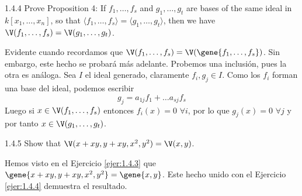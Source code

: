 \documentclass[twoside]{article}
\begin{document}
\newpage

\begin{ejercicio}{1.4.4}
Prove Proposition 4: If $f_1,\dots,f_s$ and $g_1,\dots,g_t$ are bases of the same ideal in $k[x_1,\dots,x_n]$, so that $\langle f_1,\dots,f_s\rangle = \langle g_1,\dots,g_t\rangle$, then we have $\V(f_1,\dots,f_s) = \V(g_1,\dots,g_t)$.
\end{ejercicio}
\begin{solucion}
Evidente cuando recordamos que $\V(f_1,\dots,f_s) = \V(\gene{f_1,\dots,f_s})$. Sin embargo, este hecho se probará más adelante. Probemos una inclusión, pues la otra es análoga. Sea $I$ el ideal generado, claramente $f_i,g_j\in I$. Como los $f_i$ forman una base del ideal, podemos escribir
$$
g_j = a_{1j}f_1+\dotsc a_{sj}f_s
$$
Luego si $x\in \V(f_1,\dotsc,f_s)$ entonces $f_i(x)=0$ $\forall i$, por lo que $g_j(x)=0$ $\forall j$ y por tanto $x\in \V(g_1,\dotsc,g_t)$.
\end{solucion}

\newpage

\begin{ejercicio}{1.4.5}
Show that $\V(x+xy,y+xy,x^2,y^2) = \V(x,y)$.
\end{ejercicio}
\begin{solucion}
Hemos visto en el Ejercicio \ref{ejer:1.4.3} que $\gene{x+xy,y+xy,x^2,y^2} = \gene{x,y}$.
Este hecho unido con el Ejercicio \ref{ejer:1.4.4} demuestra el resultado.
\end{solucion}

\newpage
\end{document}
